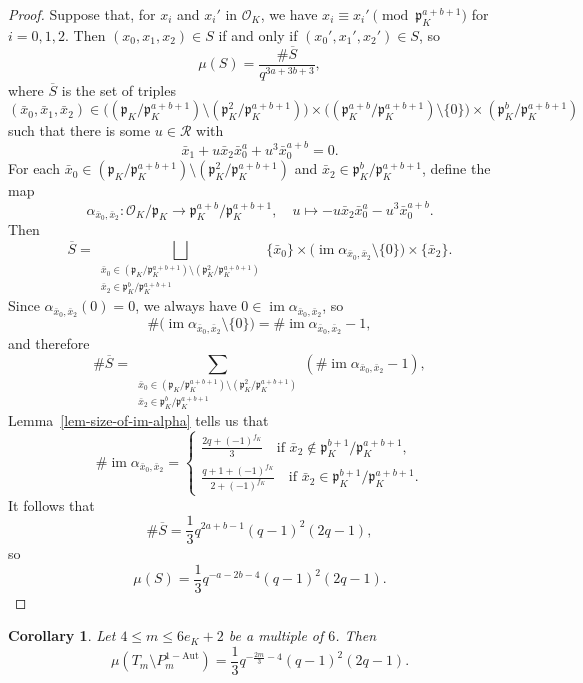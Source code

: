 \documentclass[11pt]{amsart}
\theoremstyle{theorem}
\newtheorem{corollary}[theorem]{Corollary}
\theoremstyle{example}
\theoremstyle{definition}
\numberwithin{theorem}{section}
\numberwithin{theorem}{section}
\DeclareMathOperator{\im}{im}
\newcommand{\co}{\mathcal{O}}
\newcommand{\p}{\mathfrak{p}}
\newcommand{\oneaut}{\mathrm{1-Aut}}
\begin{document}
\begin{proof}
    Suppose that, for $x_i$ and $x_i'$ in $\co_K$, we have $x_i \equiv x_i'\pmod{\p_K^{a + b + 1}}$ for $i=0,1,2$. Then $(x_0,x_1,x_2)\in S$ if and only if $(x_0',x_1',x_2') \in S$, so
    $$
    \mu(S) = \frac{\#\overline{S}}{q^{3a + 3b + 3}},
    $$
    where $\overline{S}$ is the set of triples 
    $$
    (\bar{x}_0,\bar{x}_1,\bar{x}_2) \in 
    \Big((\p_K/\p_K^{a + b + 1})\setminus (\p_K^2/\p_K^{a + b + 1})\Big) 
    \times 
    \Big((\p_K^{a + b}/\p_K^{a+b+1})\setminus \{0\}\Big)
    \times 
    (\p_K^{b}/\p_K^{a + b + 1}) 
    $$
    such that there is some $u \in \mathcal{R}$ with 
    $$
    \bar x_1 + u\bar x_2\bar x_0^{a} + u^3 \bar x_0^{a+b} = 0.
    $$
    For each $\bar x_0 \in (\p_K/\p_K^{a +b+ 1})\setminus (\p_K^2/\p_K^{a +b+ 1})$ and $\bar x_2 \in \p_K^{b}/\p_K^{a +b+ 1}$, define the map 
    $$
    \alpha_{\bar{x}_0,\bar{x}_2}: \co_K/\p_K \to \p_K^{a+b}/\p_K^{a +b+ 1},\quad u \mapsto - u\bar x_2\bar x_0^{a} - u^3 \bar x_0^{a+b}.
    $$
    Then 
    $$
    \overline{S} = \bigsqcup_{\substack{\bar x_0 \in (\p_K/\p_K^{a+b + 1})\setminus (\p_K^2/\p_K^{a+b + 1})\\ \bar x_2 \in \p_K^{b}/\p_K^{a+b + 1}}} \{\bar{x}_0\}\times \Big(\im\alpha_{\bar x_0,\bar x_2} \setminus\{0\}\Big) \times \{\bar x_2\}.
    $$
    Since $\alpha_{\bar{x}_0,\bar{x}_2}(0) = 0$, we always have $0 \in \im  \alpha_{\bar{x}_0,\bar{x}_2}$, so 
    $$
    \#\Big(\im\alpha_{\bar x_0,\bar x_2} \setminus\{0\}\Big) = \#\im\alpha_{\bar x_0,\bar x_2} - 1,
    $$
    and therefore
    $$
    \# \overline{S} = \sum_{\substack{\bar x_0 \in (\p_K/\p_K^{a+b + 1})\setminus (\p_K^2/\p_K^{a +b+ 1})\\ \bar x_2 \in \p_K^{b}/\p_K^{a+b + 1}}} (\#\im\alpha_{\bar x_0,\bar x_2} - 1),
    $$
    Lemma~\ref{lem-size-of-im-alpha} tells us that 
    $$
    \#\im\alpha_{\bar x_0, \bar x_2} = \begin{cases}
        \frac{2q + (-1)^{f_K}}{3} \quad\text{if $\bar{x}_2 \not \in \p_K^{b + 1}/\p_K^{a+b+ 1}$},
        \\
        \frac{q+1+(-1)^{f_K}}{2 + (-1)^{f_K}} \quad \text{if $\bar{x}_2  \in \p_K^{b + 1}/\p_K^{a+b + 1}$}. 
    \end{cases}
    $$
    It follows that 
    $$
    \# \overline{S} = \frac{1}{3}q^{2a + b - 1}(q-1)^2(2q-1),
    $$
    so 
    $$
    \mu(S) = \frac{1}{3}q^{-a - 2b - 4}(q-1)^2(2q-1). 
    $$
\end{proof}
\begin{corollary}
    \label{cor-Tm-minus-Pm}
    Let $4 \leq m \leq 6e_K + 2$ be a multiple of $6$. Then 
    $$
    \mu(T_m \setminus P_m^{\oneaut}) = \frac{1}{3}q^{-\frac{2m}{3} - 4}(q-1)^2(2q-1).
    $$
\end{corollary}
\end{document}
